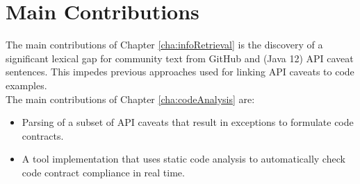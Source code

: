 \section{Main Contributions}
The main contributions of Chapter \ref{cha:infoRetrieval} is the discovery of a significant lexical gap for community text from GitHub and (Java 12) API caveat sentences. This impedes previous approaches used for linking API caveats to code examples.\\

\noindent
The main contributions of Chapter \ref{cha:codeAnalysis} are:
\begin{itemize}
	\item Parsing of a subset of API caveats that result in exceptions to formulate code contracts.
	\item A tool implementation that uses static code analysis to automatically check code contract compliance in real time.
\end{itemize}